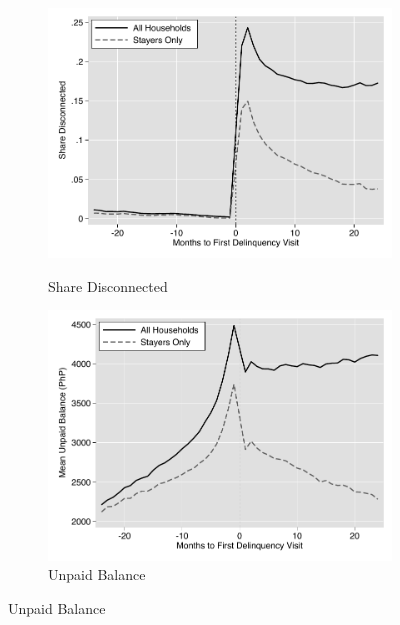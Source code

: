 \documentclass[12pt]{article}
\begin{document}
\begin{figure}[t!]
    \centering
    \vspace{2mm}
    \begin{subfigure}[b]{0.49\textwidth}
        \centering
        \caption[]{\small Share Disconnected}  
        \vspace{-1mm}
        \includegraphics[width=\textwidth,trim={.2cm .2cm .2cm 0cm}, clip=true]{tables/line_disconnection}
        \label{fig:line_disc}
    \end{subfigure}
    \hfill
    \begin{subfigure}[b]{0.49\textwidth}  
        \centering 
        \caption[]{\small Unpaid Balance}
        \vspace{-1mm}
        \includegraphics[width=\textwidth,trim={.2cm .2cm .2cm 0cm}, clip=true]{tables/line_bal}

\end{subfigure}
\end{figure}
\end{document}
